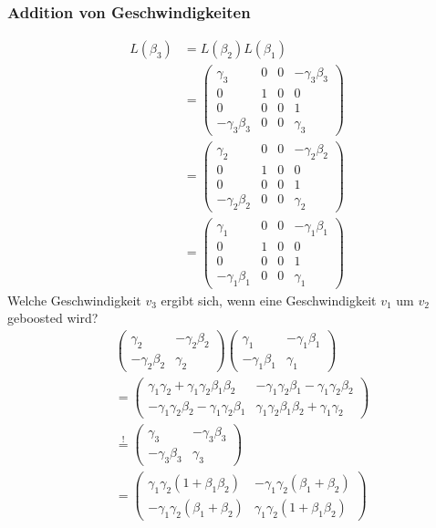 \subsubsection{Addition von Geschwindigkeiten}
\begin{align*}
L(\beta_3) &= L(\beta_2) L(\beta_1)\\
&=\begin{pmatrix}
\gamma_3 & 0 & 0 &- \gamma_3 \beta_3\\
0 & 1 & 0 & 0\\
0 & 0 & 0 & 1\\
- \gamma_3 \beta_3 & 0 & 0 & \gamma_3
\end{pmatrix}\\
&= \begin{pmatrix}
	\gamma_2 & 0 & 0 &- \gamma_2 \beta_2\\
	0 & 1 & 0 & 0\\
	0 & 0 & 0 & 1\\
	- \gamma_2 \beta_2 & 0 & 0 & \gamma_2
\end{pmatrix}\\
&= \begin{pmatrix}
	\gamma_1 & 0 & 0 &- \gamma_1 \beta_1\\
	0 & 1 & 0 & 0\\
	0 & 0 & 0 & 1\\
	- \gamma_1 \beta_1 & 0 & 0 & \gamma_1
\end{pmatrix}
\end{align*}
Welche Geschwindigkeit $v_3$ ergibt sich, wenn eine Geschwindigkeit $v_1$ um $v_2$ geboosted wird?
\begin{align*}
&\begin{pmatrix}
	\gamma_2 & -\gamma_2 \beta_2\\
	- \gamma_2 \beta_2 & \gamma_2
\end{pmatrix} \begin{pmatrix}
\gamma_1 & - \gamma_1 \beta_1\\
-\gamma_1 \beta_1 & \gamma_1
\end{pmatrix}\\
&= \begin{pmatrix}
\gamma_1 \gamma_2 + \gamma_1 \gamma_2 \beta_1 \beta_2 & - \gamma_1 \gamma_2 \beta_1 - \gamma_1 \gamma_2 \beta_2\\
- \gamma_1 \gamma_2 \beta_2 - \gamma_1 \gamma_2 \beta_1 & \gamma_1 \gamma_2 \beta_1 \beta_2 + \gamma_1 \gamma_2
\end{pmatrix}\\
&\overset{!}{=} \begin{pmatrix}
\gamma_3 & -\gamma_3 \beta_3\\
- \gamma_3 \beta_3 & \gamma_3
\end{pmatrix}\\
&= \begin{pmatrix}
\gamma_1 \gamma_2 (1 + \beta_1 \beta_2) & - \gamma_1 \gamma_2 (\beta_1 + \beta_2)\\
- \gamma_1 \gamma_2 (\beta_1 + \beta_2) & \gamma_1 \gamma_2 (1 + \beta_1 \beta_2)
\end{pmatrix}
\end{align*}
